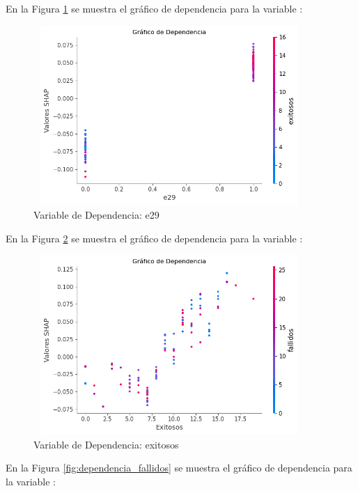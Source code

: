En la Figura \ref{fig:dependencia_e29} se muestra el gráfico de dependencia para la variable :

\begin{figure}[H]
    \centering
    \includegraphics[width=4.0611in,height=2.6861in]{img/shap_rf/e29.png}
    \caption{Variable de Dependencia: e29}
    \label{fig:dependencia_e29}
\end{figure}

En la Figura \ref{fig:dependencia_exitosos} se muestra el gráfico de dependencia para la variable :

\begin{figure}[H]
    \centering
    \includegraphics[width=4.0611in,height=2.6861in]{img/shap_rf/exitosos.png}
    \caption{Variable de Dependencia: exitosos}
    \label{fig:dependencia_exitosos}
\end{figure}

En la Figura \ref{fig:dependencia_fallidos} se muestra el gráfico de dependencia para la variable :

